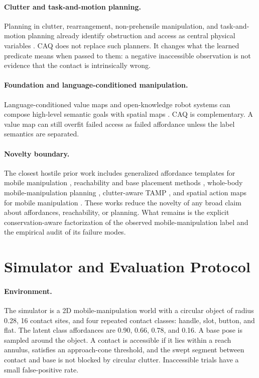 \documentclass{article}
\begin{document}
\paragraph{Clutter and task-and-motion planning.}
Planning in clutter, rearrangement, non-prehensile manipulation, and task-and-motion planning already identify obstruction and access as central physical variables \citep{rw014,rw031,rw037,rw038,rw043,rw051}. CAQ does not replace such planners. It changes what the learned predicate means when passed to them: a negative inaccessible observation is not evidence that the contact is intrinsically wrong.

\paragraph{Foundation and language-conditioned manipulation.}
Language-conditioned value maps and open-knowledge robot systems can compose high-level semantic goals with spatial maps \citep{rw017,rw048,rw067,rw078}. CAQ is complementary. A value map can still overfit failed access as failed affordance unless the label semantics are separated.

\paragraph{Novelty boundary.}
The closest hostile prior work includes generalized affordance templates for mobile manipulation \citep{rw013}, reachability and base placement methods \citep{rw003,rw052}, whole-body mobile-manipulation planning \citep{rw001,rw015}, clutter-aware TAMP \citep{rw014}, and spatial action maps for mobile manipulation \citep{rw056}. These works reduce the novelty of any broad claim about affordances, reachability, or planning. What remains is the explicit conservation-aware factorization of the observed mobile-manipulation label and the empirical audit of its failure modes.

\section{Simulator and Evaluation Protocol}
\label{sec:protocol}

\paragraph{Environment.}
The simulator is a 2D mobile-manipulation world with a circular object of radius 0.28, 16 contact sites, and four repeated contact classes: handle, slot, button, and flat. The latent class affordances are 0.90, 0.66, 0.78, and 0.16. A base pose is sampled around the object. A contact is accessible if it lies within a reach annulus, satisfies an approach-cone threshold, and the swept segment between contact and base is not blocked by circular clutter. Inaccessible trials have a small false-positive rate.
\end{document}
